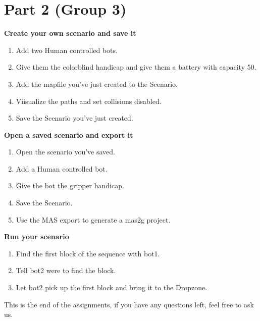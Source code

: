 \documentclass[a4paper]{article}
\begin{document}
\newpage

\section*{Part 2 (Group 3)}
\textbf{Create your own scenario and save it}
\begin{enumerate}
\item Add two Human controlled bots.
\item Give them the colorblind handicap and give them a battery with capacity 50.
\item Add the mapfile you've just created to the Scenario.
\item Viisualize the paths and set collisions disabled.
\item Save the Scenario you've just created.
\end{enumerate}

\textbf{Open a saved scenario and export it}
\begin{enumerate}
\item Open the scenario you've saved.
\item Add a Human controlled bot.
\item Give the bot the gripper handicap.
\item Save the Scenario.
\item Use the MAS export to generate a mas2g project.
\end{enumerate}

\textbf{Run your scenario}
\begin{enumerate}
\item Find the first block of the sequence with bot1.
\item Tell bot2 were to find the block.
\item Let bot2 pick up the first block and bring it to the Dropzone.
\end{enumerate}

This is the end of the assignments, if you have any questions left, feel free to ask us.
\end{document}
